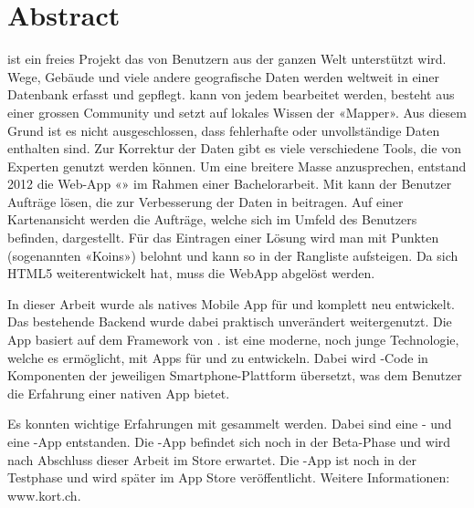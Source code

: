 \chapter*{Abstract}
\thispagestyle{scrheadings}

 ist ein freies Projekt das von Benutzern aus der ganzen Welt unterstützt wird. 
Wege, Gebäude und viele andere geografische Daten werden weltweit in einer Datenbank erfasst und gepflegt. 
 kann von jedem bearbeitet werden, besteht aus einer grossen Community und setzt auf lokales Wissen der «\gls{Mapper}». 
Aus diesem Grund ist es nicht ausgeschlossen, dass fehlerhafte oder unvollständige Daten enthalten
sind. 
Zur Korrektur der Daten gibt es viele verschiedene Tools, die von Experten genutzt werden können. 
Um eine breitere Masse anzusprechen, entstand 2012 die Web-App «\kort{}» im Rahmen einer Bachelorarbeit. 
Mit \kort{} kann der Benutzer Aufträge lösen, die zur Verbesserung der Daten in  beitragen. 
Auf einer Kartenansicht werden die Aufträge, welche sich im Umfeld des Benutzers befinden, dargestellt. 
Für das Eintragen einer Lösung wird man mit Punkten (sogenannten «Koins») belohnt und kann
so in der Rangliste aufsteigen. 
Da sich HTML5 weiterentwickelt hat, muss die \gls{WebApp} abgelöst werden.

In dieser Arbeit wurde \kort{} als natives Mobile App für  und  komplett neu entwickelt. 
Das bestehende \gls{Backend} wurde dabei praktisch unverändert weitergenutzt. 
Die App basiert auf dem  Framework von . 
 ist eine moderne, noch junge Technologie, welche es ermöglicht, mit  Apps für  und  zu entwickeln. 
Dabei wird -Code in Komponenten der jeweiligen Smartphone-Plattform übersetzt, was dem Benutzer die Erfahrung einer nativen App bietet.

Es konnten wichtige Erfahrungen mit  gesammelt werden. 
Dabei sind eine - und eine -App entstanden. 
Die -App befindet sich noch in der Beta-Phase und wird nach Abschluss dieser Arbeit im  Store erwartet. 
Die -App ist noch in der Testphase und wird später im  App Store veröffentlicht. 
Weitere Informationen: www.kort.ch. 
